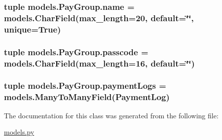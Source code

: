 \hypertarget{classmodels_1_1_pay_group_a497a5404b56ea78ec8ac675985519c25}{
\subsubsection[{name}]{\setlength{\rightskip}{0pt plus 5cm}tuple models.\-Pay\-Group.\-name = models.\-Char\-Field(max\-\_\-length=20, default=\char`\"{}\char`\"{}, unique=True)\hspace{0.3cm}{\ttfamily [static]}}}\label{classmodels_1_1_pay_group_a497a5404b56ea78ec8ac675985519c25}
\hypertarget{classmodels_1_1_pay_group_a757bf14853860015be63c29d9f4a4b76}{
\subsubsection[{passcode}]{\setlength{\rightskip}{0pt plus 5cm}tuple models.\-Pay\-Group.\-passcode = models.\-Char\-Field(max\-\_\-length=16, default=\char`\"{}\char`\"{})\hspace{0.3cm}{\ttfamily [static]}}}\label{classmodels_1_1_pay_group_a757bf14853860015be63c29d9f4a4b76}
\hypertarget{classmodels_1_1_pay_group_acbb50cbe600d3e3f492a99b948bf38a8}{
\subsubsection[{payment\-Logs}]{\setlength{\rightskip}{0pt plus 5cm}tuple models.\-Pay\-Group.\-payment\-Logs = models.\-Many\-To\-Many\-Field({\bf Payment\-Log})\hspace{0.3cm}{\ttfamily [static]}}}\label{classmodels_1_1_pay_group_acbb50cbe600d3e3f492a99b948bf38a8}


The documentation for this class was generated from the following file\-:\begin{DoxyCompactItemize}
\item 
\hyperlink{models_8py}{models.\-py}\end{DoxyCompactItemize}
